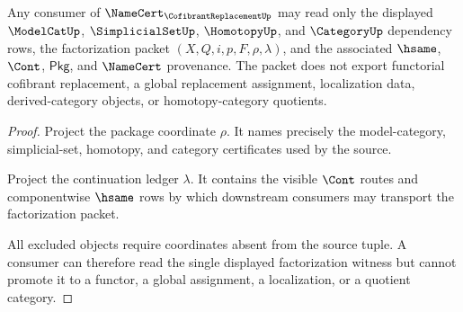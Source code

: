\begin{theorem}
\label{thm:cofibrantreplacement-dependency-boundary}
Any consumer of $\NameCert_{\CofibrantReplacementUp}$ may read only the displayed $\ModelCatUp$, $\SimplicialSetUp$, $\HomotopyUp$, and $\CategoryUp$ dependency rows, the factorization packet $(X,Q,i,p,F,\rho,\lambda)$, and the associated $\hsame$, $\Cont$, $\mathsf{Pkg}$, and $\NameCert$ provenance. The packet does not export functorial cofibrant replacement, a global replacement assignment, localization data, derived-category objects, or homotopy-category quotients.
\end{theorem}
\begin{proof}
Project the package coordinate $\rho$. It names precisely the model-category, simplicial-set, homotopy, and category certificates used by the source.

Project the continuation ledger $\lambda$. It contains the visible $\Cont$ routes and componentwise $\hsame$ rows by which downstream consumers may transport the factorization packet.

All excluded objects require coordinates absent from the source tuple. A consumer can therefore read the single displayed factorization witness but cannot promote it to a functor, a global assignment, a localization, or a quotient category.
\end{proof}

